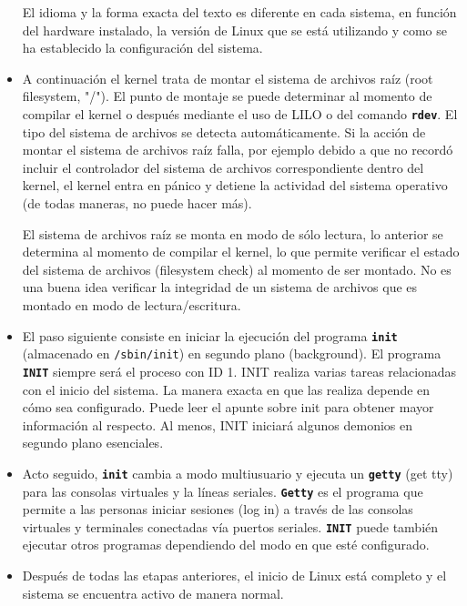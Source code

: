 \documentclass[12pt]{article}
\begin{document}
\begin{itemize}
{El idioma y la forma exacta del texto es diferente en cada sistema, en función
del hardware instalado, la versión de Linux que se está utilizando y como se ha
establecido la configuración del sistema.  }

	\item{
A continuación el kernel trata de montar el sistema de archivos raíz (root
filesystem, "/"). El punto de montaje se puede determinar al momento de compilar
el kernel o después mediante el uso de LILO o del comando
\texttt{\textbf{rdev}}. El tipo del sistema de archivos se detecta
automáticamente. Si la acción de montar el sistema de archivos raíz falla, por
ejemplo debido a que no recordó incluir el controlador del sistema de archivos
correspondiente dentro del kernel, el kernel entra en pánico y detiene la
actividad del sistema operativo (de todas maneras, no puede hacer más).  

 El sistema de archivos raíz se monta en modo de sólo lectura, lo anterior
se determina al momento de compilar el kernel, lo que permite verificar el
estado del sistema de archivos (filesystem check) al momento de ser montado. No
es una buena idea verificar la integridad de un sistema de archivos que es
montado en modo de lectura/escritura.  }

	\item{ El paso siguiente consiste en iniciar la  ejecución del
	programa \texttt{\textbf{init}} (almacenado en
	\texttt{/sbin/init}) en segundo plano (background). El
	programa \texttt{\textbf{INIT}} siempre será el proceso con ID 1. INIT
	realiza varias tareas relacionadas con el inicio del sistema. La manera
	exacta en que las realiza depende en cómo sea configurado. Puede leer el
	apunte sobre init para obtener mayor información al respecto. Al
	menos, INIT iniciará algunos demonios en segundo plano esenciales.
	}

	\item{ Acto seguido, \texttt{\textbf{init}} cambia a modo
	multiusuario y ejecuta un \texttt{\textbf{getty}} (get tty) para las
	consolas virtuales y la líneas seriales. \texttt{\textbf{Getty}} es el
	programa  que permite a las personas iniciar sesiones (log in) a través
	de las consolas virtuales y terminales conectadas vía puertos seriales.
	\texttt{\textbf{INIT}} puede también ejecutar otros programas
	dependiendo del modo en que esté configurado.  }

	\item{

Después de todas las etapas anteriores, el inicio de Linux está completo y el
sistema se encuentra activo de manera normal.  }

	\end{itemize} 
\end{document}
